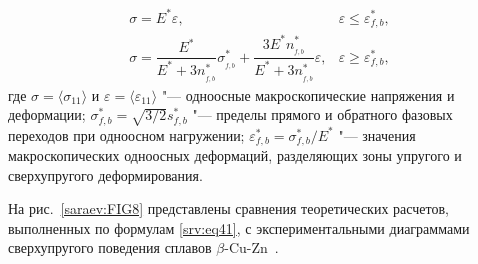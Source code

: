 \begin{equation}\label{srv:eq41}
\begin{array}{ll}
\sigma=E^{*} \varepsilon, & \varepsilon \leq \varepsilon^{*}_{{f,b}},\\[2mm]
\sigma=\dfrac{E^{*}}{E^{*}+3 n^{*}_{_{f,b}}} \sigma^{*}_{_{f,b}}+\dfrac{3 E^{*} n^{*}_{_{f,b}}}{E^{*}+3 n^{*}_{_{f,b}}} \varepsilon, & \varepsilon \geq \varepsilon^{*}_{{f,b}},
\end{array}
\end{equation}
где $\sigma= \langle  {\sigma_{{11}}}  \rangle $ и $\varepsilon= \langle  {\varepsilon_{{11}}}  \rangle $ "--- одноосные макроскопические напряжения и деформации; 
$\sigma^{*}_{{f,b}}=\sqrt{{3}/{2}} s^{*}_{{f,b}}$ "--- пределы прямого и обратного фазовых переходов при одноосном нагружении; $\varepsilon^{*}_{{f,b}}={\sigma^{*}_{{f,b}}}/{E^{*}}$ "--- значения макроскопических одноосных деформаций, разделяющих зоны упругого и сверхупругого деформирования.


На рис.~\ref{saraev:FIG8} представлены сравнения теоретических расчетов, выполненных по формулам \eqref{srv:eq41}, с экспериментальными диаграммами сверхупругого поведения сплавов  $\beta$-Cu-Zn~\cite{Murakami1972}.


